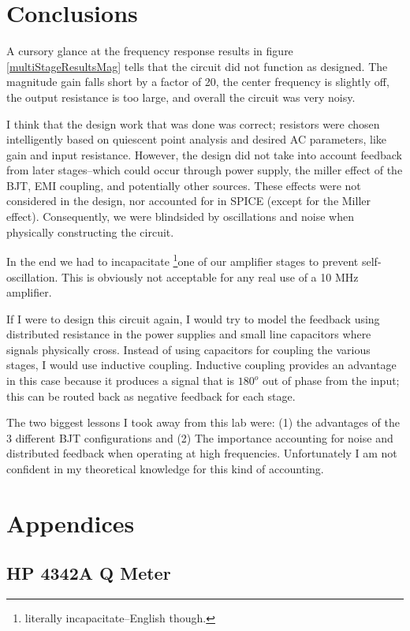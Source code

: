 \documentclass[titlepage, letterpaper, 10.5pt]{article}
\begin{document}
\clearpage
\section{Conclusions}

A cursory glance at the frequency response results in figure
\ref{multiStageResultsMag} tells that the circuit did not function
as designed. The magnitude gain falls short by a factor of 20, the
center frequency is slightly off, the output resistance is too large,
and overall the circuit was very noisy.

I think that the design work that was done was correct; resistors were
chosen intelligently based on quiescent point analysis and desired AC
parameters, like gain and input resistance. However, the design did not
take into account feedback from later stages--which could occur through
power supply, the miller effect of the BJT, EMI coupling, and
potentially other sources. These effects were not considered in the
design, nor accounted for in SPICE (except for the Miller effect).
Consequently, we were blindsided by oscillations and noise when
physically constructing the circuit.

In the end we had to incapacitate
\footnote{literally incapacitate--English though.}one of our amplifier
stages to prevent self-oscillation. This is obviously not acceptable
for any real use of a 10 MHz amplifier. 

If I were to design this circuit again, I would try to model the feedback
using distributed resistance in the power supplies and small line
capacitors where signals physically cross. Instead of using capacitors
for coupling the various stages, I would use inductive coupling. Inductive
coupling provides an advantage in this case because it produces a signal
that is $180^{o}$ out of phase from the input; this can be routed back
as negative feedback for each stage.

The two biggest lessons I took away from this lab were: (1) the advantages
of the 3 different BJT configurations and (2) The importance accounting
for noise and distributed feedback when operating at high frequencies.
Unfortunately I am not confident in my theoretical knowledge for this
kind of accounting.

\section{Appendices}

\subsection{HP 4342A Q Meter}
\label{qMeter}
\end{document}
